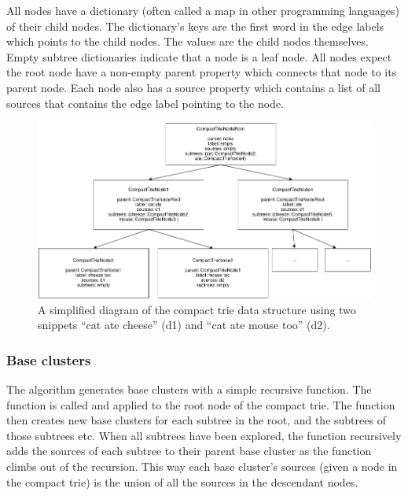 All nodes have a dictionary (often called a map in other programming languages) of their child nodes. The dictionary's keys are the first word in the edge labels which points to the child nodes. The values are the child nodes themselves. Empty subtree dictionaries indicate that a node is a leaf node. All nodes expect the root node have a non-empty parent property which connects that node to its parent node. Each node also has a source property which contains a list of all sources that contains the edge label pointing to the node.

\begin{figure}[!ht]
  \begin{center}
    \includegraphics[totalheight=0.3\textheight]{Figures/compacttriedatastructure}
  \end{center}
  \caption{A simplified diagram of the compact trie data structure using two snippets “cat ate cheese” (d1) and “cat ate mouse too” (d2).}
  \label{fig:compacttriedatastructure}
\end{figure}

\subsubsection{Base clusters}
\label{subsubsec:baseclusters}
The \CTC algorithm generates base clusters with a simple recursive function. The function is called and applied to the root node of the compact trie. The function then creates new base clusters for each subtree in the root, and the subtrees of those subtrees etc. When all subtrees have been explored, the function recursively adds the sources of each subtree to their parent base cluster as the function climbs out of the recursion. This way each base cluster's sources (given a node in the compact trie) is the union of all the sources in the descendant nodes.

